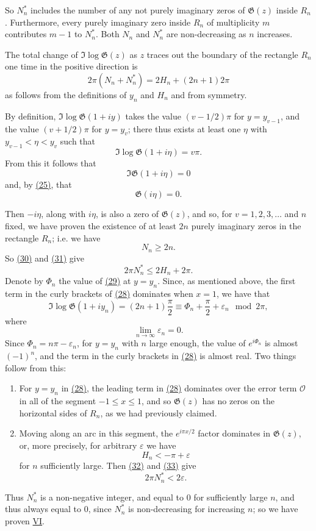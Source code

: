 \documentclass{article}
\theoremstyle{plain}
\newcommand{\GG}{\mathfrak{G}}
\newcommand{\error}{\mathcal{O}}
\newcommand{\oldpage}[1]{\marginpar{\footnotesize$\Big\vert$ \textit{p.~#1}}}
\begin{document}
\begin{enumerate}[I.]
    So $N_n^*$ includes the number of any not purely imaginary zeros of $\GG(z)$ inside $R_n$.
    Furthermore, every purely imaginary zero inside $R_n$ of multiplicity $m$ contributes $m-1$ to $N_n^*$.
    Both $N_n$ and $N_n^*$ are non-decreasing as $n$ increases.

    The total change of $\Im\log\GG(z)$ as $z$ traces out the boundary of the rectangle $R_n$ one time in the positive direction is
    \[
    \label{30}
      2\pi(N_n + N_n^*) = 2H_n + (2n+1)2\pi
    \tag{30}
    \]
    as follows from the definitions of $y_n$ and $H_n$ and from symmetry.

    By definition, $\Im\log\GG(1+iy)$ takes the value $(v-1/2)\pi$ for $y=y_{v-1}$, and the value $(v+1/2)\pi$ for $y=y_v$;
    there thus exists at least one $\eta$ with $y_{v-1}<\eta<y_v$ such that
    \[
      \Im\log\GG(1+i\eta) = v\pi.
    \]
    From this it follows that
    \[
      \Im\GG(1+i\eta) = 0
    \]
    and, by \hyperref[25]{(25)}, that
    \[
      \GG(i\eta) = 0.
    \]

    Then $-i\eta$, along with $i\eta$, is also a zero of $\GG(z)$, and so, for $v=1,2,3,\ldots$ and $n$ fixed, we have proven the existence of at least $2n$ purely imaginary zeros in the rectangle $R_n$;
    i.e. we have
    \[
    \label{31}
      N_n \geqslant 2n.
    \tag{31}
    \]
    So \hyperref[30]{(30)} and \hyperref[31]{(31)} give
    \[
    \label{32}
      2\pi N_n^* \leqslant 2H_n + 2\pi.
    \tag{32}
    \]
    Denote by $\Phi_n$ the value of \hyperref[29]{(29)} at $y=y_n$.
    Since, as mentioned above, the first term in the curly brackets of \hyperref[28]{(28)} dominates when $x=1$, we have that
    \[
      \Im\log\GG(1+iy_n)
      = (2n+1)\frac\pi2
      \equiv \Phi_n + \frac\pi2 + \varepsilon_n \mod2\pi,
    \]
    where
    \[
      \lim_{n\to\infty}\varepsilon_n = 0.
    \]
\oldpage{315}
    Since $\Phi_n=n\pi-\varepsilon_n$, for $y=y_n$ with $n$ large enough, the value of $e^{i\Phi_n}$ is almost $(-1)^n$, and the term in the curly brackets in \hyperref[28]{(28)} is almost real.
    Two things follow from this:
    \begin{enumerate}[1)]
      \item For $y=y_n$ in \hyperref[28]{(28)}, the leading term in \hyperref[28]{(28)} dominates over the error term $\error$ in all of the segment $-1\leqslant x\leqslant 1$, and so $\GG(z)$ has no zeros on the horizontal sides of $R_n$, as we had previously claimed.
      \item Moving along an arc in this segment, the $e^{i\pi x/2}$ factor dominates in $\GG(z)$, or, more precisely, for arbitrary $\varepsilon$ we have
        \[
        \label{33}
          H_n < -\pi + \varepsilon
        \tag{33}
        \]
        for $n$ sufficiently large.
        Then \hyperref[32]{(32)} and \hyperref[33]{(33)} give
        \[
          2\pi N_n^* < 2\varepsilon.
        \]
    \end{enumerate}
    Thus $N_n^*$ is a non-negative integer, and equal to $0$ for sufficiently large $n$, and thus always equal to $0$, since $N_n^*$ is non-decreasing for increasing $n$;
    so we have proven \hyperref[VI]{VI}.
\end{enumerate}
\end{document}
